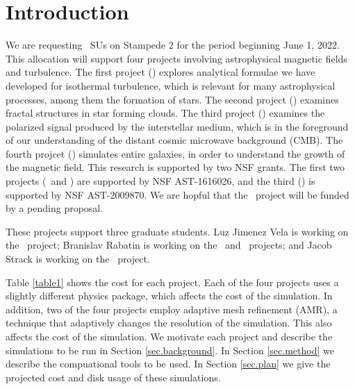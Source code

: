 \section{Introduction}
\label{sec.intro}

We are requesting \SUtotal\ SUs on Stampede 2 for the period beginning June 1,
2022.  This allocation will support four projects involving astrophysical
magnetic fields and turbulence.  The first project (\nameTurbulence) explores analytical
formulae we have developed for isothermal turbulence, which is relevant for many
astrophysical processes, among them the formation of stars.  The second project
(\nameCores) examines fractal structures in star forming clouds.
  The third project (\nameCMB) examines the polarized signal
produced by the interstellar medium, which is in the foreground of our understanding of
the distant cosmic microwave background (CMB). The fourth projcet (\nameGalaxies)
simulates entire galaxies, in order to understand the growth of the magnetic
field.
This research is supported by two NSF grants.  The first two projects
(\nameTurbulence\ and \nameCores)  
are
supported by NSF AST-1616026, and the third (\nameCMB) is supported by 
NSF AST-2009870.
We are hopful that the \nameGalaxies\ project will be funded by a pending
proposal.

These projects support three graduate students.  Luz Jimenez Vela is working on
the \nameCores\ project; Branislav Rabatin is working on the \nameTurbulence\
and \nameCMB\ projects; and Jacob Strack is working on the \nameGalaxies\
project.


Table \ref{table1} shows the cost for each project.  Each of the four projects
uses a slightly different physics package, which affects  the cost of the
simulation.  In addition, two of the four projects employ adaptive mesh
refinement (AMR), a technique that adaptively changes the resolution of the
simulation.  This also affects the cost of the simulation.
We motivate each project and describe the simulations to be
run in Section
\ref{sec.background}.  In Section \ref{sec.method} we
describe the compuational tools to be used.  In Section \ref{sec.plan} we
give the projected cost  and disk usage of these simulations.

